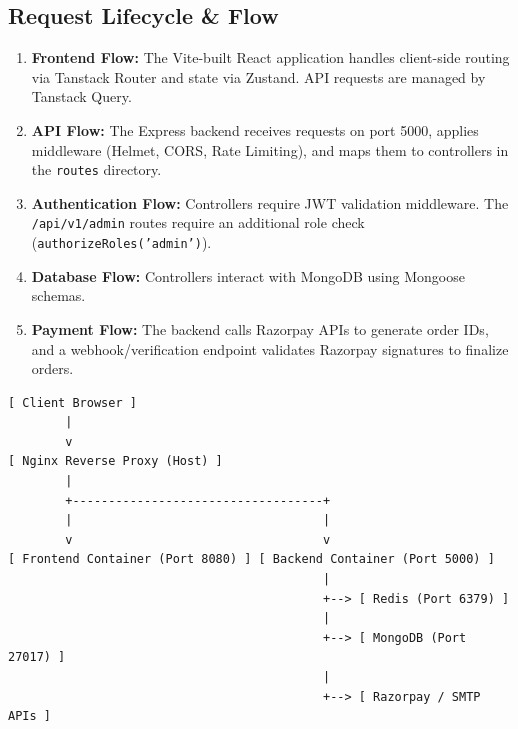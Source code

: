\documentclass[11pt,a4paper]{article}
\begin{document}
\subsection*{Request Lifecycle \& Flow}
\begin{enumerate}[leftmargin=*]
    \item \textbf{Frontend Flow:} The Vite-built React application handles
          client-side routing via Tanstack Router and state via Zustand.
          API requests are managed by Tanstack Query.
    \item \textbf{API Flow:} The Express backend receives requests on port
          5000, applies middleware (Helmet, CORS, Rate Limiting), and maps
          them to controllers in the \texttt{routes} directory.
    \item \textbf{Authentication Flow:} Controllers require JWT validation
          middleware. The \texttt{/api/v1/admin} routes require an additional
          role check (\texttt{authorizeRoles('admin')}).
    \item \textbf{Database Flow:} Controllers interact with MongoDB using
          Mongoose schemas.
    \item \textbf{Payment Flow:} The backend calls Razorpay APIs to generate
          order IDs, and a webhook/verification endpoint validates Razorpay
          signatures to finalize orders.
\end{enumerate}

\begin{verbatim}
[ Client Browser ]
        |
        v
[ Nginx Reverse Proxy (Host) ]
        |
        +-----------------------------------+
        |                                   |
        v                                   v
[ Frontend Container (Port 8080) ] [ Backend Container (Port 5000) ]
                                            |
                                            +--> [ Redis (Port 6379) ]
                                            |
                                            +--> [ MongoDB (Port 27017) ]
                                            |
                                            +--> [ Razorpay / SMTP APIs ]
\end{verbatim}

\end{document}
